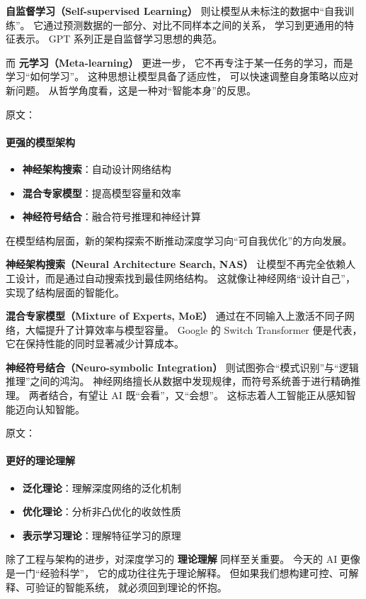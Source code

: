 {\bf 自监督学习（Self-supervised Learning）} 则让模型从未标注的数据中“自我训练”。  
它通过预测数据的一部分、对比不同样本之间的关系，  
学习到更通用的特征表示。  
GPT 系列正是自监督学习思想的典范。  

而 {\bf 元学习（Meta-learning）} 更进一步，  
它不再专注于某一任务的学习，而是学习“如何学习”。  
这种思想让模型具备了适应性，  
可以快速调整自身策略以应对新问题。  
从哲学角度看，这是一种对“智能本身”的反思。


原文：
\paragraph{更强的模型架构}
\begin{itemize}
\item {\bf 神经架构搜索}：自动设计网络结构
\item {\bf 混合专家模型}：提高模型容量和效率
\item {\bf 神经符号结合}：融合符号推理和神经计算
\end{itemize}
在模型结构层面，新的架构探索不断推动深度学习向“可自我优化”的方向发展。  

{\bf 神经架构搜索（Neural Architecture Search, NAS）}  
让模型不再完全依赖人工设计，而是通过自动搜索找到最佳网络结构。  
这就像让神经网络“设计自己”，实现了结构层面的智能化。  

{\bf 混合专家模型（Mixture of Experts, MoE）}  
通过在不同输入上激活不同子网络，大幅提升了计算效率与模型容量。  
Google 的 Switch Transformer 便是代表，它在保持性能的同时显著减少计算成本。  

{\bf 神经符号结合（Neuro-symbolic Integration）}  
则试图弥合“模式识别”与“逻辑推理”之间的鸿沟。  
神经网络擅长从数据中发现规律，而符号系统善于进行精确推理。  
两者结合，有望让 AI 既“会看”，又“会想”。  
这标志着人工智能正从感知智能迈向认知智能。


原文：
\paragraph{更好的理论理解}
\begin{itemize}
\item {\bf 泛化理论}：理解深度网络的泛化机制
\item {\bf 优化理论}：分析非凸优化的收敛性质
\item {\bf 表示学习理论}：理解特征学习的原理
\end{itemize}
除了工程与架构的进步，对深度学习的 {\bf 理论理解} 同样至关重要。  
今天的 AI 更像是一门“经验科学”，  
它的成功往往先于理论解释。  
但如果我们想构建可控、可解释、可验证的智能系统，  
就必须回到理论的怀抱。  

